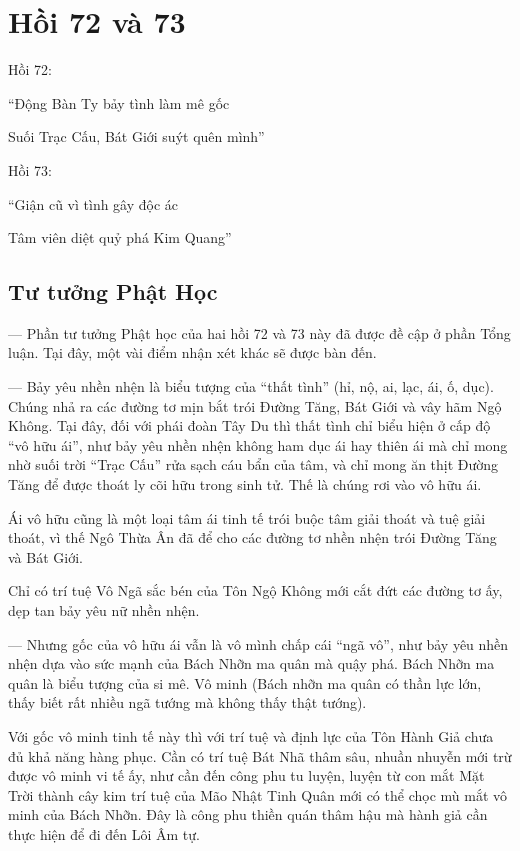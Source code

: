 \chapter{Hồi 72 và 73} %
\label{cha:hoi_72_73}

Hồi 72:

\begin{itshape}
``Động Bàn Ty bảy tình làm mê gốc

Suối Trạc Cấu, Bát Giới suýt quên mình''
\end{itshape}

Hồi 73:

\begin{itshape}
``Giận cũ vì tình gây độc ác

Tâm viên diệt quỷ phá Kim Quang''
\end{itshape}

\section{Tư tưởng Phật Học} %
\label{sec:72_73_phat_hoc}

— Phần tư tưởng Phật học của hai hồi 72 và 73 này đã được đề cập ở phần Tổng luận. Tại đây, một vài điểm nhận xét khác sẽ được bàn đến.

— Bảy yêu nhền nhện là biểu tượng của ``thất tình'' (hỉ, nộ, ai, lạc, ái, ố, dục). Chúng nhả ra các đường tơ mịn bắt trói Đường Tăng, Bát Giới và vây hãm Ngộ Không. Tại đây, đối với phái đoàn Tây Du thì thất tình chỉ biểu hiện ở cấp độ ``vô hữu ái'', như bảy yêu nhền nhện không ham dục ái hay thiên ái mà chỉ mong nhờ suối trời ``Trạc Cấu'' rửa sạch cáu bẩn của tâm, và chỉ mong ăn thịt Đường Tăng để được thoát ly cõi hữu trong sinh tử. Thế là chúng rơi vào vô hữu ái.

Ái vô hữu cũng là một loại tâm ái tinh tế trói buộc tâm giải thoát và tuệ giải thoát, vì thế Ngô Thừa Ân đã để cho các đường tơ nhền nhện trói Đường Tăng và Bát Giới.

Chỉ có trí tuệ Vô Ngã sắc bén của Tôn Ngộ Không mới cắt đứt các đường tơ ấy, dẹp tan bảy yêu nữ nhền nhện.

— Nhưng gốc của vô hữu ái vẫn là vô mình chấp cái ``ngã vô'', như bảy yêu nhền nhện dựa vào sức mạnh của Bách Nhỡn ma quân mà quậy phá. Bách Nhỡn ma quân là biểu tượng của si mê. Vô minh (Bách nhỡn ma quân có thần lực lớn, thấy biết rất nhiều ngã tướng mà không thấy thật tướng).

Với gốc vô minh tinh tế này thì với trí tuệ và định lực của Tôn Hành Giả chưa đủ khả năng hàng phục. Cần có trí tuệ Bát Nhã thâm sâu, nhuần nhuyễn mới trừ được vô minh vi tế ấy, như cần đến công phu tu luyện, luyện từ con mắt Mặt Trời thành cây kim trí tuệ của Mão Nhật Tinh Quân mới có thể chọc mù mắt vô minh của Bách Nhỡn. Đây là công phu thiền quán thâm hậu mà hành giả cần thực hiện để đi đến Lôi Âm tự.

